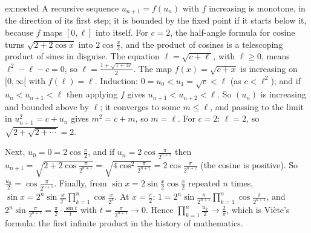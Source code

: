 \begin{solution}{ex:nested}
\idea A recursive sequence $u_{n+1}=f(u_n)$ with $f$ increasing is monotone, in the direction of its first step; it is bounded by the fixed point if it starts below it, because $f$ maps $[0,\ell]$ into itself. For $c=2$, the half-angle formula for cosine turns $\sqrt{2+2\cos x}$ into $2\cos\frac x2$, and the product of cosines is a telescoping product of sines in disguise.
\writeup The equation $\ell=\sqrt{c+\ell}$, with $\ell\ge0$, means $\ell^2-\ell-c=0$, so $\ell=\frac{1+\sqrt{1+4c}}2$. The map $f(x)=\sqrt{c+x}$ is increasing on $[0,\infty[$ with $f(\ell)=\ell$.
Induction: $0=u_0<u_1=\sqrt c<\ell$ (as $c<\ell^2$); and if $u_n<u_{n+1}<\ell$ then applying $f$ gives $u_{n+1}<u_{n+2}<\ell$. So $(u_n)$ is increasing and bounded above by $\ell$; it converges to some $m\le\ell$, and passing to the limit in $u_{n+1}^2=c+u_n$ gives $m^2=c+m$, so $m=\ell$.
For $c=2$: $\ell=2$, so $\sqrt{2+\sqrt{2+\cdots}}=2$.

Next, $u_0=0=2\cos\frac\pi2$, and if $u_n=2\cos\frac\pi{2^{n+1}}$ then $u_{n+1}=\sqrt{2+2\cos\frac\pi{2^{n+1}}}=\sqrt{4\cos^2\frac\pi{2^{n+2}}}=2\cos\frac\pi{2^{n+2}}$ (the cosine is positive). So $\frac{u_n}2=\cos\frac\pi{2^{n+1}}$.
Finally, from $\sin x=2\sin\frac x2\cos\frac x2$ repeated $n$ times, $\sin x=2^n\sin\frac x{2^n}\prod_{k=1}^n\cos\frac x{2^k}$. At $x=\frac\pi2$:
$1=2^n\sin\frac\pi{2^{n+1}}\prod_{k=1}^n\cos\frac\pi{2^{k+1}}$, and $2^n\sin\frac\pi{2^{n+1}}=\frac\pi2\cdot\frac{\sin t}t$ with $t=\frac\pi{2^{n+1}}\to0$. Hence
$\prod_{k=1}^n\frac{u_k}2\to\frac2\pi$, which is Vi\`ete's formula: the first infinite product in the history of mathematics.
\end{solution}

